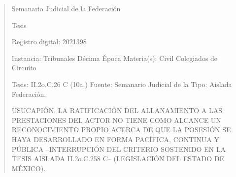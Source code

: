 \documentclass[11pt,a4paper]{article}
\begin{document}
\begin{quote}
                                                   Semanario Judicial de la Federación

                                               Tesis

 Registro digital: 2021398

 Instancia: Tribunales             Décima Época                         Materia(s): Civil
 Colegiados de Circuito

 Tesis: II.2o.C.26 C (10a.)        Fuente: Semanario Judicial de la     Tipo: Aislada
                                   Federación.


USUCAPIÓN. LA RATIFICACIÓN DEL ALLANAMIENTO A LAS PRESTACIONES DEL ACTOR NO
TIENE COMO ALCANCE UN RECONOCIMIENTO PROPIO ACERCA DE QUE LA POSESIÓN SE
HAYA DESARROLLADO EN FORMA PACÍFICA, CONTINUA Y PÚBLICA –INTERRUPCIÓN DEL
CRITERIO SOSTENIDO EN LA TESIS AISLADA II.2o.C.258 C– (LEGISLACIÓN DEL ESTADO DE
MÉXICO).



\end{quote}
\end{document}
